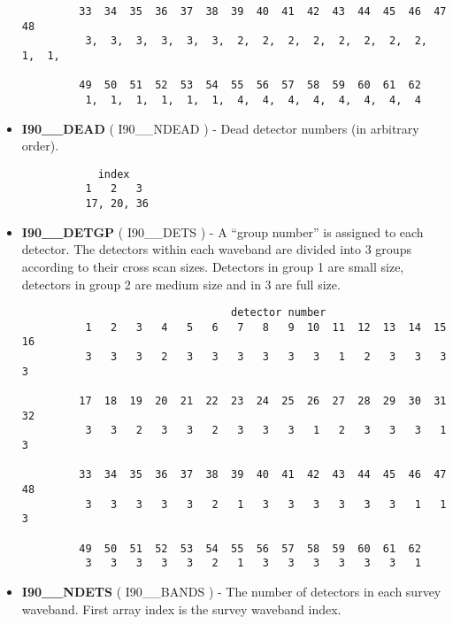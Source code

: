\begin{itemize}
\begin{minipage}[t]{\textwidth}
\begin{verbatim}
         33  34  35  36  37  38  39  40  41  42  43  44  45  46  47  48
          3,  3,  3,  3,  3,  3,  2,  2,  2,  2,  2,  2,  2,  2,  1,  1,

         49  50  51  52  53  54  55  56  57  58  59  60  61  62
          1,  1,  1,  1,  1,  1,  4,  4,  4,  4,  4,  4,  4,  4
\end{verbatim}
\normalsize
\end{minipage}

\item {\bf I90\_\_DEAD} ( I90\_\_NDEAD ) - Dead detector numbers (in arbitrary order).

\begin{minipage}[t]{\textwidth}
\small
\begin{verbatim}
            index                           
          1   2   3
          17, 20, 36
\end{verbatim}
\normalsize
\end{minipage}

\item {\bf I90\_\_DETGP} ( I90\_\_DETS ) - A ``group number'' is assigned to
each detector. The detectors within each waveband are divided into 3 groups
according to their cross scan sizes. Detectors in group 1 are small size,
detectors in group 2 are medium size and in 3 are full size. 

\begin{minipage}[t]{\textwidth}
\small
\begin{verbatim}
                                 detector number
          1   2   3   4   5   6   7   8   9  10  11  12  13  14  15  16
          3   3   3   2   3   3   3   3   3   3   1   2   3   3   3   3 

         17  18  19  20  21  22  23  24  25  26  27  28  29  30  31  32
          3   3   2   3   3   2   3   3   3   1   2   3   3   3   1   3

         33  34  35  36  37  38  39  40  41  42  43  44  45  46  47  48
          3   3   3   3   3   2   1   3   3   3   3   3   3   1   1   3

         49  50  51  52  53  54  55  56  57  58  59  60  61  62
          3   3   3   3   3   2   1   3   3   3   3   3   3   1
\end{verbatim}
\normalsize
\end{minipage}

\item {\bf I90\_\_NDETS} ( I90\_\_BANDS ) - The number of detectors in each survey 
waveband. First array index is the survey waveband index.



\end{itemize}
